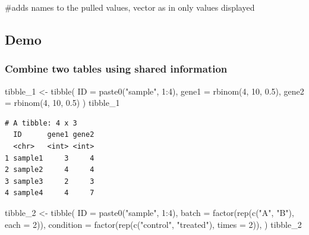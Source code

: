 \documentclass[
  letterpaper,
  DIV=11,
  numbers=noendperiod]{scrartcl}
\newenvironment{Shaded}{\begin{snugshade}}{\end{snugshade}}
\newcommand{\AttributeTok}[1]{\textcolor[rgb]{0.40,0.45,0.13}{#1}}
\newcommand{\CommentTok}[1]{\textcolor[rgb]{0.37,0.37,0.37}{#1}}
\newcommand{\DecValTok}[1]{\textcolor[rgb]{0.68,0.00,0.00}{#1}}
\newcommand{\FloatTok}[1]{\textcolor[rgb]{0.68,0.00,0.00}{#1}}
\newcommand{\FunctionTok}[1]{\textcolor[rgb]{0.28,0.35,0.67}{#1}}
\newcommand{\NormalTok}[1]{\textcolor[rgb]{0.00,0.23,0.31}{#1}}
\newcommand{\OtherTok}[1]{\textcolor[rgb]{0.00,0.23,0.31}{#1}}
\newcommand{\SpecialCharTok}[1]{\textcolor[rgb]{0.37,0.37,0.37}{#1}}
\newcommand{\StringTok}[1]{\textcolor[rgb]{0.13,0.47,0.30}{#1}}
\begin{document}
\begin{Shaded}
\begin{Highlighting}[]
\CommentTok{\#adds names to the pulled values, vector as in only values displayed}
\end{Highlighting}
\end{Shaded}

\subsection{Demo}\label{demo-10}

\subsubsection{Combine two tables using shared
information}\label{combine-two-tables-using-shared-information}

\begin{Shaded}
\begin{Highlighting}[]
\NormalTok{tibble\_1 }\OtherTok{\textless{}{-}} \FunctionTok{tibble}\NormalTok{(}
  \AttributeTok{ID =} \FunctionTok{paste0}\NormalTok{(}\StringTok{"sample"}\NormalTok{, }\DecValTok{1}\SpecialCharTok{:}\DecValTok{4}\NormalTok{),}
  \AttributeTok{gene1 =} \FunctionTok{rbinom}\NormalTok{(}\DecValTok{4}\NormalTok{, }\DecValTok{10}\NormalTok{, }\FloatTok{0.5}\NormalTok{),}
  \AttributeTok{gene2 =} \FunctionTok{rbinom}\NormalTok{(}\DecValTok{4}\NormalTok{, }\DecValTok{10}\NormalTok{, }\FloatTok{0.5}\NormalTok{)}
\NormalTok{)}
\NormalTok{tibble\_1}
\end{Highlighting}
\end{Shaded}

\begin{verbatim}
# A tibble: 4 x 3
  ID      gene1 gene2
  <chr>   <int> <int>
1 sample1     3     4
2 sample2     4     4
3 sample3     2     3
4 sample4     4     7
\end{verbatim}

\begin{Shaded}
\begin{Highlighting}[]
\NormalTok{tibble\_2 }\OtherTok{\textless{}{-}} \FunctionTok{tibble}\NormalTok{(}
  \AttributeTok{ID =} \FunctionTok{paste0}\NormalTok{(}\StringTok{"sample"}\NormalTok{, }\DecValTok{1}\SpecialCharTok{:}\DecValTok{4}\NormalTok{),}
  \AttributeTok{batch =} \FunctionTok{factor}\NormalTok{(}\FunctionTok{rep}\NormalTok{(}\FunctionTok{c}\NormalTok{(}\StringTok{"A"}\NormalTok{, }\StringTok{"B"}\NormalTok{), }\AttributeTok{each =} \DecValTok{2}\NormalTok{)),}
  \AttributeTok{condition =} \FunctionTok{factor}\NormalTok{(}\FunctionTok{rep}\NormalTok{(}\FunctionTok{c}\NormalTok{(}\StringTok{"control"}\NormalTok{, }\StringTok{"treated"}\NormalTok{), }\AttributeTok{times =} \DecValTok{2}\NormalTok{)),}
\NormalTok{)}
\NormalTok{tibble\_2}
\end{Highlighting}
\end{Shaded}
\end{document}
